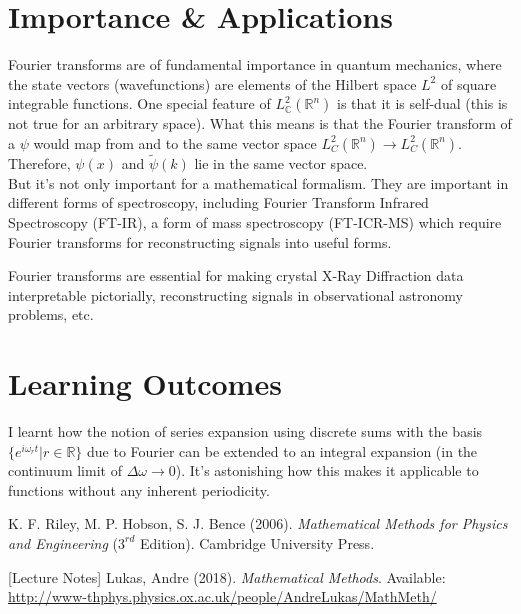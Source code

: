 \documentclass{article}
\begin{document}
	\section*{Importance \& Applications}
	
	Fourier transforms are of fundamental importance in quantum mechanics, where the state vectors (wavefunctions) are elements of the Hilbert space $L^2$ of square integrable functions. One special feature of $L^2_{\mathbb{C}}(\mathbb{R}^n)$ is that it is self-dual (this is not true for an arbitrary space). What this means is that the Fourier transform of a $\psi$ would map from and to the same vector space $L^2_{C}(\mathbb{R}^n) \to L^2_{C}(\mathbb{R}^n)$\cite{Lukas}. Therefore, $\psi(x)$ and $\tilde{\psi}(k)$ lie in the same vector space. \\
	
	But it's not only important for a mathematical formalism. They are important in different forms of spectroscopy, including Fourier Transform Infrared Spectroscopy (FT-IR), a form of mass spectroscopy (FT-ICR-MS) which require Fourier transforms for reconstructing signals into useful forms.
	
	Fourier transforms are essential for making crystal X-Ray Diffraction data interpretable pictorially, reconstructing signals in observational astronomy problems, etc.
	
	
	
	\section*{Learning Outcomes}
	
	I learnt how the notion of series expansion using discrete sums with the basis $\{e^{i\omega_r t} | r \in \mathbb{R} \}$ due to Fourier can be extended to an integral expansion (in the continuum limit of $\Delta \omega \to 0$). It's astonishing how this makes it applicable to functions without any inherent periodicity.
	
	\begin{thebibliography}{widestlabel}
		 K. F. Riley, M. P. Hobson, S. J. Bence (2006). {\it Mathematical Methods for Physics and Engineering} ($3^{rd}$ Edition). Cambridge University Press.
		
		 [Lecture Notes] Lukas, Andre (2018). {\it Mathematical Methods}. Available: \url{http://www-thphys.physics.ox.ac.uk/people/AndreLukas/MathMeth/}
		
	\end{thebibliography}
\end{document}
